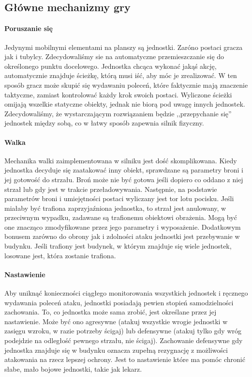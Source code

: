 \documentclass[licencjacka]{pracamgr}
\begin{document}
    \subsection{Główne mechanizmy gry}
    \paragraph{Poruszanie się}
      Jedynymi mobilnymi elementami na planszy są jednostki. Zaróno postaci gracza jak i tubylcy. Zdecydowaliśmy sie na automatyczne
      przemieszczanie się do określonego punktu docelowego. Jednostka chcąca wykonać jakąś akcję, automatycznie znajduje 
      ścieżkę, którą musi iść, aby móc je zrealizować. W ten sposób gracz może skupić się wydawaniu poleceń, które faktycznie mają
      znaczenie taktyczne, zamiast kontrolować każdy krok swoich postaci. Wyliczone ścieżki omijają wszelkie statyczne obiekty, jednak
      nie biorą pod uwagę innych jednostek. Zdecydowaliśmy, że wystarczającym rozwiązaniem będzie ,,przepychanie się'' jednostek między sobą, 
      co w łatwy sposób zapewnia silnik fizyczny. 
    \paragraph{Walka}
      Mechanika walki zaimplementowana w silniku jest dość skomplikowana. Kiedy jednostka decyduje się zaatakować inny obiekt, 
      sprawdzane są parametry broni i jej gotowość do strzału. Broń może nie być gotowa jeśli dopiero co oddano z niej strzał lub gdy 
      jest w trakcie przeładowywania. Następnie, na podstawie parametrów broni i umiejętności postaci wyliczany jest tor lotu pocisku.
      Jeśli miałaby być trafiona zaprzyjaźniona jednostka, to strzał jest anulowany, w przeciwnym wypadku, zadawane są trafionemu obiektowi
      obrażenia. Mogą być one znacząco zmodyfikowane przez jego parametry i wyposażenie. Dodatkowym bonusem zarówno do obrony jak i zdolności
      ataku jednostki jest przebywanie w budynku. Jeśli trafiony jest budynek, w którym znajduje się wiele jednostek, losowane jest, która 
      zostanie trafiona. 
    \paragraph{Nastawienie}
      Aby uniknąć konieczności ciągłego monitorowania wszystkich jednostek i ręcznego wydawania poleceń ataku, jednostki posiadają pewien
      stopień samodzielności zachowania. To, co jednostka może sama zrobić, jest określane przez jej nastawienie. Może być ono agresywne
      (atakuj wszystkie wrogie jednostki w zasięgu wzroku, w razie potrzeby ścigaj) lub defensywne (atakuj tylko gdy wróg podejdzie na 
      odległość pewnego strzału, nie ścigaj). Zachowanie defensywne gdy jednostka znajduje się w budynku oznacza zupełną rezygnację z 
      możliwości atakowania na rzecz lepszej ochrony. Jest to nastawienie które ma pomóc chronić słabe, mało bojowe jednostki, takie jak lekarz.
\end{document}
